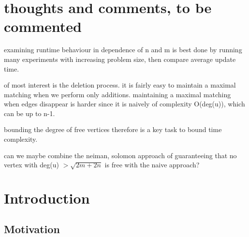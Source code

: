 \documentclass{article}      %
\newcommand\todo[1]{\textcolor{blue}{#1}}
\begin{document}
\pagebreak

\begin{abstract}

\end{abstract}

\pagebreak

\tableofcontents

\pagebreak

\section{thoughts and comments, to be commented}

examining runtime behaviour in dependence of n and m is best done by running many experiments with increasing problem size, then compare average update time.

of most interest is the deletion process. it is fairly easy to maintain a maximal matching when we perform only additions. maintaining a maximal matching when edges disappear is harder since it is naively of complexity O(deg(u)), which can be up to n-1.

bounding the degree of free vertices therefore is a key task to bound time complexity.

can we maybe combine the neiman, solomon approach of guaranteeing that no vertex with deg(u) $> \sqrt{2m+2n}$ is free with the naive approach?

\pagebreak

\section{Introduction}
\label{sec:intro}

\subsection{Motivation}
\label{sec:motivatio}

\end{document}
